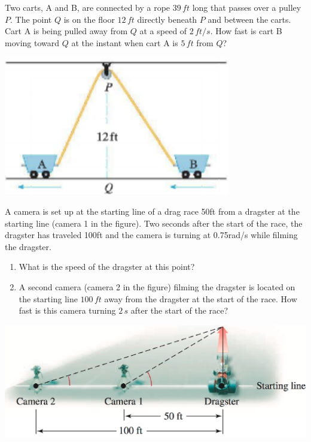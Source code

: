 \documentclass[mathNotesPreamble]{subfiles}
\begin{document}
\noindent
\begin{minipage}[t]{0.7\linewidth}\mbox{}
  \begin{ex*}
  Two carts, A and B, are connected by a rope $39\,ft$ long that passes over a pulley $P$. The point $Q$ is on the floor $12\,ft$ directly beneath $P$ and between the carts.  Cart A is being pulled away from $Q$ at  a speed of $2\,ft/s$.  How fast is cart B moving toward $Q$ at the instant when cart A is $5\,ft$ from $Q$?
\end{ex*}
\end{minipage}%
\begin{minipage}[t]{0.3\linewidth}\mbox{}
  \begin{flushright}
    \vspace*{7.5pt}
    \includegraphics[width=0.9\linewidth]{images/briggs_03_11/cart.png}
  \end{flushright}
\end{minipage}%
\pagebreak

\begin{ex*}
   A camera is set up at the starting line of a drag race 50ft from a dragster at the starting line (camera 1 in the figure). Two seconds after the start of the race, the dragster has traveled 100ft and the camera is turning at 0.75rad/s while filming the dragster.
  \begin{enumerate}[label=\alph*)]
    \item What is the speed of the dragster at this point?
    \item A second camera (camera 2 in the figure) filming the dragster is located on the starting line $100\,ft$ away from the dragster at the start of the race. How fast is this camera turning $2\,s$ after the start of the race?
  \end{enumerate}
\end{ex*}
\vspace*{-20pt}
\begin{flushright}
  \includegraphics[width=0.5\linewidth]{images/briggs_03_11/dragrace.png}
\end{flushright}
\pagebreak
\end{document}
